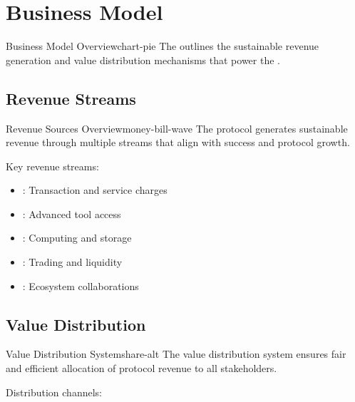 
\section{Business Model}

\begin{mfai-box}{Business Model Overview}{chart-pie}
The  outlines the sustainable revenue generation and value distribution mechanisms that power the .
\end{mfai-box}

\subsection{Revenue Streams}

\begin{mfai-box-learn}{Revenue Sources Overview}{money-bill-wave}
The protocol generates sustainable revenue through multiple streams that align with  success and protocol growth.
\end{mfai-box-learn}

Key revenue streams:

\begin{itemize}[leftmargin=*]
\item {}: Transaction and service charges
\item {}: Advanced tool access
\item {}: Computing and storage
\item {}: Trading and liquidity
\item {}: Ecosystem collaborations
\end{itemize}

\subsection{Value Distribution}

\begin{mfai-box-build}{Value Distribution System}{share-alt}
The value distribution system ensures fair and efficient allocation of protocol revenue to all stakeholders.
\end{mfai-box-build}

Distribution channels:

